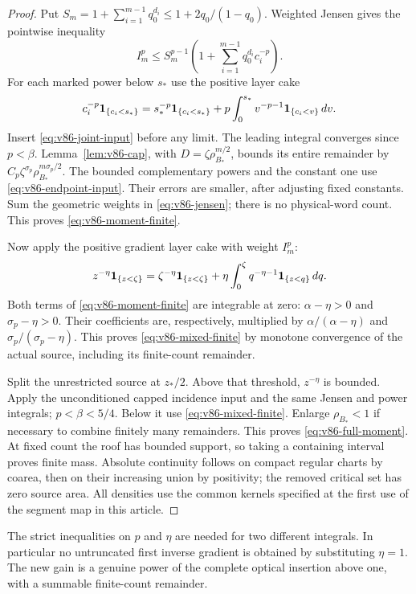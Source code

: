 \begin{proof}
Put $S_m=1+\sum_{i=1}^{m-1}q_0^{d_i}\le1+2q_0/(1-q_0)$.
Weighted Jensen gives the pointwise inequality
\begin{equation}\label{eq:v86-jensen}
 I_m^p\le S_m^{p-1}\left(1+\sum_{i=1}^{m-1}q_0^{d_i}c_i^{-p}\right).
\end{equation}
For each marked power below $s_*$ use the positive layer cake
\[
 c_i^{-p}\mathbf1_{\{c_i<s_*\}}
 =s_*^{-p}\mathbf1_{\{c_i<s_*\}}
   +p\int_0^{s_*}v^{-p-1}\mathbf1_{\{c_i<v\}}\,dv.
\]
Insert \eqref{eq:v86-joint-input} before any limit. The leading
integral converges since $p<\beta$. Lemma~\ref{lem:v86-cap}, with
$D=\zeta\rho_{B_*}^{m/2}$, bounds its entire remainder by
$C_p\zeta^{\sigma_p}\rho_{B_*}^{m\sigma_p/2}$.
The bounded complementary powers and the constant one use
\eqref{eq:v86-endpoint-input}. Their errors are smaller, after
adjusting fixed constants. Sum the geometric weights in
\eqref{eq:v86-jensen}; there is no physical-word count. This proves
\eqref{eq:v86-moment-finite}.

Now apply the positive gradient layer cake with weight $I_m^p$:
\[
 z^{-\eta}\mathbf1_{\{z<\zeta\}}
 =\zeta^{-\eta}\mathbf1_{\{z<\zeta\}}
   +\eta\int_0^\zeta q^{-\eta-1}\mathbf1_{\{z<q\}}\,dq.
\]
Both terms of \eqref{eq:v86-moment-finite} are integrable at zero:
$\alpha-\eta>0$ and $\sigma_p-\eta>0$. Their coefficients are,
respectively, multiplied by $\alpha/(\alpha-\eta)$ and
$\sigma_p/(\sigma_p-\eta)$. This proves
\eqref{eq:v86-mixed-finite} by monotone convergence of the actual
source, including its finite-count remainder.

Split the unrestricted source at $z_*/2$. Above that threshold,
$z^{-\eta}$ is bounded. Apply the unconditioned capped incidence
input and the same Jensen and power integrals; $p<\beta<5/4$.
Below it use \eqref{eq:v86-mixed-finite}. Enlarge $\rho_{B_*}<1$
if necessary to combine finitely many remainders. This proves
\eqref{eq:v86-full-moment}. At fixed count the roof has bounded
support, so taking a containing interval proves finite mass.
Absolute continuity follows on compact regular charts by coarea,
then on their increasing union by positivity; the removed critical
set has zero source area. All densities use the common kernels
specified at the first use of the segment map in this article.
\end{proof}

The strict inequalities on $p$ and $\eta$ are needed for two different
integrals. In particular no untruncated first inverse gradient is
obtained by substituting $\eta=1$. The new gain is a genuine power
of the complete optical insertion above one, with a summable
finite-count remainder.
